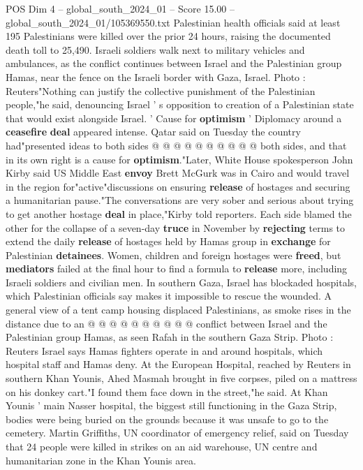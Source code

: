 \begin{textsample}{POS Dim 4 – global\_south\_2024\_01 – Score 15.00 – global\_south\_2024\_01/105369550.txt}
Palestinian health officials said at least 195 Palestinians were killed over the prior 24 hours, raising the documented death toll to 25,490.
Israeli soldiers walk next to military vehicles and ambulances, as the conflict continues between Israel and the Palestinian group Hamas, near the fence on the Israeli border with Gaza, Israel.
Photo : Reuters"Nothing can justify the collective punishment of the Palestinian people,"he said, denouncing Israel ' s opposition to creation of a Palestinian state that would exist alongside Israel. ' Cause for \textbf{optimism} ' Diplomacy around a \textbf{ceasefire} \textbf{deal} appeared intense.
Qatar said on Tuesday the country had"presented ideas to both sides @ @ @ @ @ @ @ @ @ @ both sides, and that in its own right is a cause for \textbf{optimism}."Later, White House spokesperson John Kirby said US Middle East \textbf{envoy} Brett McGurk was in Cairo and would travel in the region for"active"discussions on ensuring \textbf{release} of hostages and securing a humanitarian pause."The conversations are very sober and serious about trying to get another hostage \textbf{deal} in place,"Kirby told reporters.
Each side blamed the other for the collapse of a seven-day \textbf{truce} in November by \textbf{rejecting} terms to extend the daily \textbf{release} of hostages held by Hamas group in \textbf{exchange} for Palestinian \textbf{detainees}.
Women, children and foreign hostages were \textbf{freed}, but \textbf{mediators} failed at the final hour to find a formula to \textbf{release} more, including Israeli soldiers and civilian men.
In southern Gaza, Israel has blockaded hospitals, which Palestinian officials say makes it impossible to rescue the wounded.
A general view of a tent camp housing displaced Palestinians, as smoke rises in the distance due to an @ @ @ @ @ @ @ @ @ @ conflict between Israel and the Palestinian group Hamas, as seen Rafah in the southern Gaza Strip.
Photo : Reuters Israel says Hamas fighters operate in and around hospitals, which hospital staff and Hamas deny.
At the European Hospital, reached by Reuters in southern Khan Younis, Ahed Masmah brought in five corpses, piled on a mattress on his donkey cart."I found them face down in the street,"he said.
At Khan Younis ' main Nasser hospital, the biggest still functioning in the Gaza Strip, bodies were being buried on the grounds because it was unsafe to go to the cemetery.
Martin Griffiths, UN coordinator of emergency relief, said on Tuesday that 24 people were killed in strikes on an aid warehouse, UN centre and humanitarian zone in the Khan Younis area.

\end{textsample}
